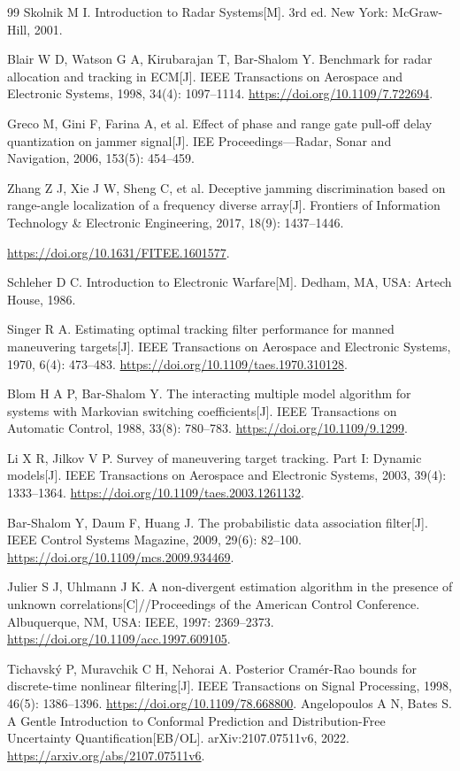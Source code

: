 \documentclass[UTF8,a4paper,zihao=-4]{ctexart}
\begin{document}
{\begin{thebibliography}{99}
 Skolnik M I. Introduction to Radar Systems[M]. 3rd ed. New York: McGraw-Hill, 2001.

 Blair W D, Watson G A, Kirubarajan T, Bar-Shalom Y. Benchmark for radar allocation and tracking in ECM[J]. IEEE Transactions on Aerospace and Electronic Systems, 1998, 34(4): 1097--1114. \url{https://doi.org/10.1109/7.722694}.

 Greco M, Gini F, Farina A, et al. Effect of phase and range gate pull-off delay quantization on jammer signal[J]. IEE Proceedings---Radar, Sonar and Navigation, 2006, 153(5): 454--459.

 Zhang Z J, Xie J W, Sheng C, et al. Deceptive jamming discrimination based on range-angle localization of a frequency diverse array[J]. Frontiers of Information Technology \& Electronic Engineering, 2017, 18(9): 1437--1446.

\url{https://doi.org/10.1631/FITEE.1601577}.

 Schleher D C. Introduction to Electronic Warfare[M]. Dedham, MA, USA: Artech House, 1986.

 Singer R A. Estimating optimal tracking filter performance for manned maneuvering targets[J]. IEEE Transactions on Aerospace and Electronic Systems, 1970, 6(4): 473--483.
\url{https://doi.org/10.1109/taes.1970.310128}.

 Blom H A P, Bar-Shalom Y. The interacting multiple model algorithm for systems with Markovian switching coefficients[J]. IEEE Transactions on Automatic Control, 1988, 33(8): 780--783.
\url{https://doi.org/10.1109/9.1299}.

 Li X R, Jilkov V P. Survey of maneuvering target tracking. Part I: Dynamic models[J]. IEEE Transactions on Aerospace and Electronic Systems, 2003, 39(4): 1333--1364.
\url{https://doi.org/10.1109/taes.2003.1261132}.

 Bar-Shalom Y, Daum F, Huang J. The probabilistic data association filter[J]. IEEE Control Systems Magazine, 2009, 29(6): 82--100.
\url{https://doi.org/10.1109/mcs.2009.934469}.

 Julier S J, Uhlmann J K. A non-divergent estimation algorithm in the presence of unknown correlations[C]//Proceedings of the American Control Conference. Albuquerque, NM, USA: IEEE, 1997: 2369--2373.
\url{https://doi.org/10.1109/acc.1997.609105}.

 Tichavský P, Muravchik C H, Nehorai A. Posterior Cramér-Rao bounds for discrete-time nonlinear filtering[J]. IEEE Transactions on Signal Processing, 1998, 46(5): 1386--1396.
\url{https://doi.org/10.1109/78.668800}.
 Angelopoulos A N, Bates S. A Gentle Introduction to Conformal Prediction and Distribution-Free Uncertainty Quantification[EB/OL]. arXiv:2107.07511v6, 2022. \url{https://arxiv.org/abs/2107.07511v6}.


\end{thebibliography}}
\end{document}
